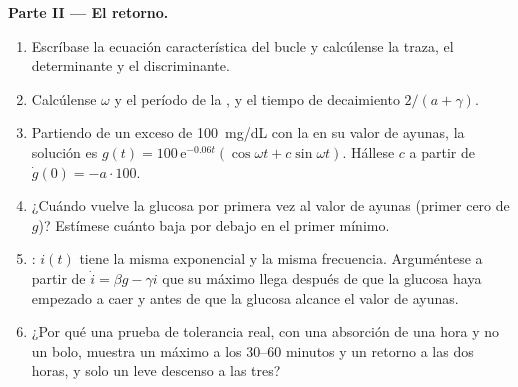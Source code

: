 \begin{problem}
\medskip
\noindent\textbf{Parte II --- El retorno.}
\begin{enumerate}[resume]
  \item Escríbase la ecuación característica del bucle y calcúlense la
        traza, el determinante y el discriminante.
  \item Calcúlense $\omega$ y el período de la ,
        y el tiempo de decaimiento $2/(a + \gamma)$.
  \item Partiendo de un exceso de \qty{100}{mg/dL} con la  en su
        valor de ayunas, la solución es $g(t) = 100\,\mathrm{e}^{-0.06t}
        (\cos\omega t + c\sin\omega t)$. Hállese $c$ a partir de $\dot g(0) = -a\cdot
        100$.
  \item ¿Cuándo vuelve la glucosa por primera vez al valor de ayunas
        (primer cero de $g$)? Estímese cuánto baja por debajo en el
        primer mínimo.
  \item {}: $i(t)$ tiene la misma exponencial y la misma
        frecuencia. Arguméntese a partir de $\dot i = \beta g - \gamma i$
        que su máximo llega después de que la glucosa haya empezado a
        caer y antes de que la glucosa alcance el valor de ayunas.
  \item ¿Por qué una prueba de tolerancia real, con una absorción de una
        hora y no un bolo, muestra un máximo a los 30--60 minutos y un
        retorno a las dos horas, y solo un leve descenso a las tres?
\end{enumerate}


\end{problem}
